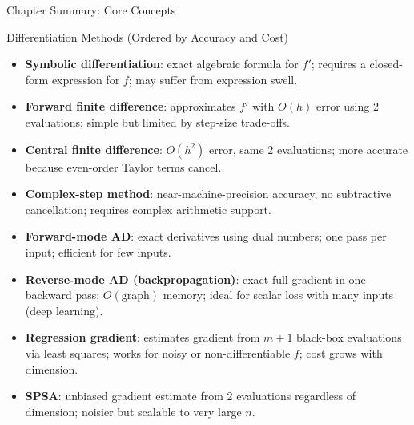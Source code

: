 \documentclass[aspectratio=169,10pt]{beamer}
\begin{document}
\begin{frame}[allowframebreaks]{Chapter Summary: Core Concepts}
  \begin{block}{Differentiation Methods (Ordered by Accuracy and Cost)}
    \begin{itemize}
      \item \textbf{Symbolic differentiation}: exact algebraic formula for
            $f'$; requires a closed-form expression for $f$; may suffer from
            expression swell.
      \item \textbf{Forward finite difference}: approximates $f'$ with $O(h)$
            error using 2 evaluations; simple but limited by step-size
            trade-offs.
      \item \textbf{Central finite difference}: $O(h^2)$ error, same 2
            evaluations; more accurate because even-order Taylor terms cancel.
      \item \textbf{Complex-step method}: near-machine-precision accuracy,
            no subtractive cancellation; requires complex arithmetic support.
      \item \textbf{Forward-mode AD}: exact derivatives using dual numbers;
            one pass per input; efficient for few inputs.
      \item \textbf{Reverse-mode AD (backpropagation)}: exact full gradient
            in one backward pass; $O(\text{graph})$ memory; ideal for scalar
            loss with many inputs (deep learning).
      \item \textbf{Regression gradient}: estimates gradient from
            $m+1$ black-box evaluations via least squares; works for noisy
            or non-differentiable $f$; cost grows with dimension.
      \item \textbf{SPSA}: unbiased gradient estimate from 2 evaluations
            regardless of dimension; noisier but scalable to very large $n$.
    \end{itemize}
  \end{block}

\end{frame}
\end{document}
